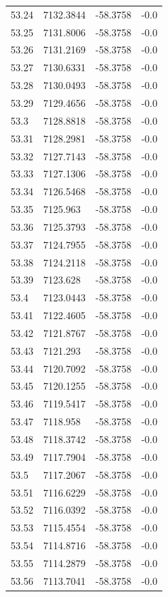 \begin{table}[H]
\begin{tabular}{llll}
53.24 & 7132.3844 & -58.3758 & -0.0 \\
53.25 & 7131.8006 & -58.3758 & -0.0 \\
53.26 & 7131.2169 & -58.3758 & -0.0 \\
53.27 & 7130.6331 & -58.3758 & -0.0 \\
53.28 & 7130.0493 & -58.3758 & -0.0 \\
53.29 & 7129.4656 & -58.3758 & -0.0 \\
53.3 & 7128.8818 & -58.3758 & -0.0 \\
53.31 & 7128.2981 & -58.3758 & -0.0 \\
53.32 & 7127.7143 & -58.3758 & -0.0 \\
53.33 & 7127.1306 & -58.3758 & -0.0 \\
53.34 & 7126.5468 & -58.3758 & -0.0 \\
53.35 & 7125.963 & -58.3758 & -0.0 \\
53.36 & 7125.3793 & -58.3758 & -0.0 \\
53.37 & 7124.7955 & -58.3758 & -0.0 \\
53.38 & 7124.2118 & -58.3758 & -0.0 \\
53.39 & 7123.628 & -58.3758 & -0.0 \\
53.4 & 7123.0443 & -58.3758 & -0.0 \\
53.41 & 7122.4605 & -58.3758 & -0.0 \\
53.42 & 7121.8767 & -58.3758 & -0.0 \\
53.43 & 7121.293 & -58.3758 & -0.0 \\
53.44 & 7120.7092 & -58.3758 & -0.0 \\
53.45 & 7120.1255 & -58.3758 & -0.0 \\
53.46 & 7119.5417 & -58.3758 & -0.0 \\
53.47 & 7118.958 & -58.3758 & -0.0 \\
53.48 & 7118.3742 & -58.3758 & -0.0 \\
53.49 & 7117.7904 & -58.3758 & -0.0 \\
53.5 & 7117.2067 & -58.3758 & -0.0 \\
53.51 & 7116.6229 & -58.3758 & -0.0 \\
53.52 & 7116.0392 & -58.3758 & -0.0 \\
53.53 & 7115.4554 & -58.3758 & -0.0 \\
53.54 & 7114.8716 & -58.3758 & -0.0 \\
53.55 & 7114.2879 & -58.3758 & -0.0 \\
53.56 & 7113.7041 & -58.3758 & -0.0 \\

\end{tabular}
\end{table}
